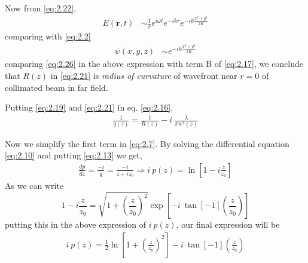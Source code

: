 \documentclass[11pt,a4paper]{article}
\numberwithin{equation}{section}
\begin{document}
Now from \ref{eq:2.22},
\begin{align}
	E(\boldsymbol{r},t) &\sim \frac{1}{r} e^{i\omega t} e^{-ikr} {e^{-ik\frac{x^2+y^2}{2R}}}
\end{align}
comparing with \ref{eq:2.2}
\begin{align}
	\psi({x,y,z}) &\sim e^{-ik\frac{x^2+y^2}{2R}} \label{eq:2.26}
\end{align}
comparing \ref{eq:2.26} in the above expression with term B of \ref{eq:2.17}, we conclude that $R(z)$ in \ref{eq:2.21} is \textit{radius of curvature} of wavefront near $r=0$ of collimated beam in far field.


Putting \ref{eq:2.19} and \ref{eq:2.21} in eq. \ref{eq:2.16},
\begin{align}
	\boxed{\frac{1}{q(z)} = \frac{1}{R(z)} - i\: \frac{\lambda}{\pi w^2(z)}} \label{eq:2.27}
\end{align}


Now we simplify the first term in \ref{eq:2.7}. By solving the differential equation \ref{eq:2.10} and putting \ref{eq:2.13} we get,
\begin{align}
	\frac{dp}{dz}= \frac{-i}{q} =\frac{-i}{z+iz_0} \Rightarrow i\:p(z) = \ln\left[1- i \frac{z}{z_0}\right]
\end{align}
As we can write
$$
1- i \frac{z}{z_0} = \sqrt{1+ \left(\frac{z}{z_0}\right)^2} \exp\left[{-i\:\tan[-1](\frac{z}{z_0})}\right]
$$
putting this in the above expression of $i\:p(z)$, our final expression will be
\begin{align}
	i\:p(z)=\frac{1}{2}\ln\left[1+ \left(\frac{z}{z_0}\right)^2\right]-i\: \tan[-1](\frac{z}{z_0}) \label{eq:2.29}
\end{align}
\end{document}
